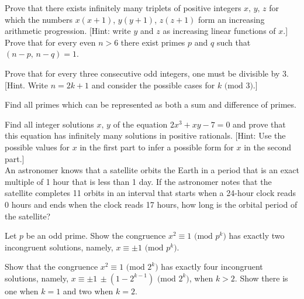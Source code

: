 \documentclass[a4paper,11pt]{article}
\theoremstyle{mythm}
\theoremstyle{mydef}
\renewcommand{\pmod}[1]{\text{ (mod $#1$)}}
\begin{document}
 Prove that there exists infinitely many triplets of
positive integers $x,\,y,\,z$ for which the numbers $x(x+1)$, $y(y+1)$, $z(z+1)$
form an increasing arithmetic progression. [Hint: write $y$ and $z$ as
increasing linear functions of $x$.] \\

 Prove that for every even $n>6$ there exist primes
$p$ and $q$ such that $(n-p,\,n-q)=1$. \\

\begin{enumerate*}[{\bf (a)}]
\item Prove that for every three consecutive odd integers, one must be divisible
  by 3. [Hint. Write $n=2k+1$ and consider the possible cases for $k \pmod{3}$.]
\item Find all primes which can be represented as both a sum and difference of
  primes. \\
\end{enumerate*}

 Find all integer solutions $x,\,y$ of the equation
$2x^3+xy-7=0$ and prove that this equation has infinitely many solutions in
positive rationals. [Hint: Use the possible values for $x$ in the first part to
infer a possible form for $x$ in the second part.] \\

 An astronomer knows that a satellite orbits the
Earth in a period that is an exact multiple of 1 hour that is less than 1 day.
If the astronomer notes that the satellite completes 11 orbits in an interval
that starts when a 24-hour clock reads 0 hours and ends when the clock reads 17
hours, how long is the orbital period of the satellite? \\

\begin{enumerate*}[{\bf (a)}]
\item Let $p$ be an odd prime. Show the congruence $x^2 \equiv 1\pmod{p^k}$ has
  exactly two incongruent solutions, namely, $x \equiv \pm1 \pmod{p^k}$.
\item Show that the congruence $x^2 \equiv 1 \pmod{2^k}$ has exactly four
  incongruent solutions, namely, $x \equiv \pm1\,\pm(1-2^{k-1}) \pmod{2^k}$,
  when $k>2$. Show there is one when $k=1$ and two when $k=2$.
\end{enumerate*}
\end{document}
